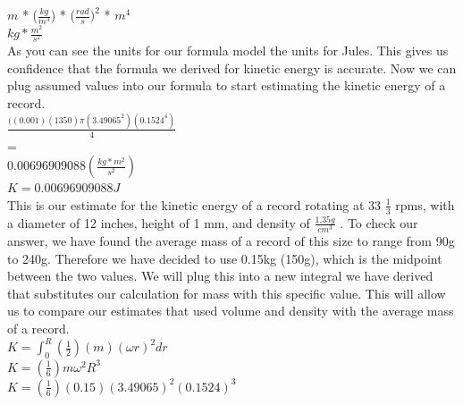 \documentclass[a4paper, 11pt, oneside]{book} %
\begin{document}
\large{$m$ * ($\frac{kg}{m^3}$) * ($\frac{rad}{s})^2$ * $m^4$\\
\vspace{0.5\baselineskip} %
\large{$kg * \frac{m^2}{s^2}$}\\
\vspace{0.5\baselineskip} %
As you can see the units for our formula model the units for Jules. This gives us confidence that the formula we derived for kinetic energy is accurate. Now we can plug assumed values into our formula to start estimating the kinetic energy of a record. \\
\vspace{0.5\baselineskip} %
$\frac{((0.001)(1350)\pi(3.49065^2)(0.1524^4)}{4}$\\
\vspace{0.5\baselineskip} %
\large{=}\\
\vspace{0.5\baselineskip} %
$0.00696909088(\frac{kg*m^2}{s^2})$\\
\vspace{0.5\baselineskip} %
$K = 0.00696909088J$\\
This is our estimate for the kinetic energy of a record rotating at 33 $\frac{1}{3}$  rpms, with a diameter of 12 inches, height of 1 mm, and density of $\frac{1.35g}{cm^3}$ . To check our answer, we have found the average mass of a record of this size to range from 90g to 240g. Therefore we have decided to use 0.15kg (150g), which is the midpoint between the two values. We will plug this into a new integral we have derived that substitutes our calculation for mass with this specific value. This will allow us to compare our estimates that used volume and density with the average mass of a record.\\
\vspace{0.5\baselineskip} %
$K = \int_{0}^{R} (\frac{1}{2})(m)(\omega r)^2dr$\\
\vspace{0.5\baselineskip} %
$K = (\frac{1}{6})m\omega^2R^3$\\
\vspace{0.5\baselineskip} %
$K =  (\frac{1}{6})(0.15)(3.49065)^2(0.1524)^3$\\
\vspace{0.5\baselineskip} %
}
\end{document}
